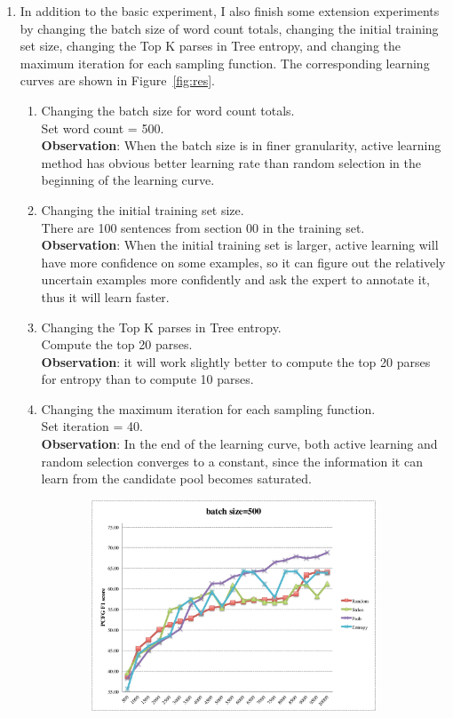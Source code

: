\documentclass[winfonts,UTF8]{article}
\begin{document}
\begin{enumerate}
\item
In addition to the basic experiment, I also finish some extension experiments by changing the batch size of word count totals, changing the initial training set size, changing the Top K parses in Tree entropy, and changing the maximum iteration for each sampling function. The corresponding learning curves are shown in Figure~\ref{fig:res}.

\begin{enumerate}
\item Changing the batch size for word count totals.\\
Set  word count = 500.\\
\textbf{Observation}: When the batch size is in finer granularity, active learning method has obvious better learning rate than random selection in the beginning of the learning curve.
\item Changing the initial training set size.\\
There are 100 sentences from section 00 in the training set.\\
\textbf{Observation}: When the initial training set is larger, active learning will have more confidence on some examples, so it can figure out the relatively uncertain examples more confidently and ask the expert to annotate it, thus it will learn faster.
\item Changing the Top K parses in Tree entropy.\\
Compute the top 20 parses.\\
\textbf{Observation}: it will work slightly better to compute the top 20 parses for entropy than to compute 10 parses.
\item Changing the maximum iteration for each sampling function.\\
Set iteration = 40.\\
\textbf{Observation}: In the end of the learning curve, both active learning and random selection converges to a constant, since the information it can learn from the candidate pool becomes saturated.
\end{enumerate}
\begin{figure}[!htbp]
\begin{subfigure}[b]{0.45\textwidth}
\includegraphics[width=\textwidth]{res2.pdf}

\end{subfigure}
\end{figure}
\end{enumerate}
\end{document}
